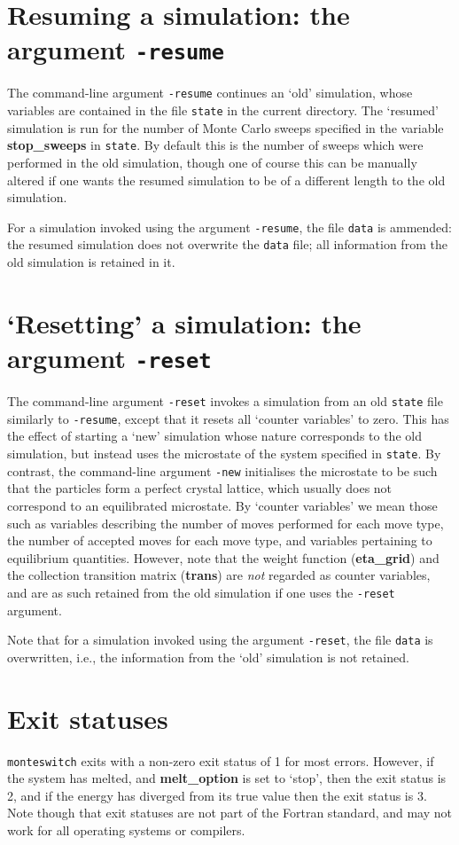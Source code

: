 \documentclass{report}
\begin{document}
\section{Resuming a simulation: the argument \texttt{-resume}}\label{sec:resume}
The command-line argument \texttt{-resume} continues an `old' simulation, whose variables are contained in the file \texttt{state} in the current 
directory. The `resumed' simulation is run for the number of Monte Carlo sweeps specified in the variable \textbf{stop\_sweeps} in \texttt{state}.
By default this is the number of sweeps which were performed in the old simulation, though one of course this can be manually altered if one wants
the resumed simulation to be of a different length to the old simulation.

For a simulation invoked using the argument \texttt{-resume}, the file \texttt{data} is ammended: the resumed simulation does not overwrite the
\texttt{data} file; all information from the old simulation is retained in it.

\section{`Resetting' a simulation: the argument \texttt{-reset}}\label{sec:reset}
The command-line argument \texttt{-reset} invokes a simulation from an old \texttt{state} file similarly to \texttt{-resume}, except that it
resets all `counter variables' to zero. This has the effect of starting a `new' simulation whose nature corresponds to the old simulation, 
but instead uses the microstate of the system specified in \texttt{state}. By contrast, the command-line argument \texttt{-new} initialises the 
microstate to be such that the particles form a perfect crystal lattice, which usually does not correspond to an equilibrated microstate.
By `counter variables' we mean those such as variables describing the number of moves performed for each move type, the number of accepted moves 
for each move type, and variables pertaining to equilibrium quantities. However, note that the weight function (\textbf{eta\_grid}) and the
collection transition matrix (\textbf{trans}) are \emph{not} regarded as counter variables, and are as such retained from the old simulation
if one uses the \texttt{-reset} argument.

Note that for a simulation invoked using the argument \texttt{-reset}, the file \texttt{data} is overwritten, i.e., the information from the `old'
simulation is not retained.

\section{Exit statuses}
\texttt{monteswitch} exits with a non-zero exit status of 1 for most errors. However, if the system has melted, and \textbf{melt\_option} is set to
`stop', then the exit status is 2, and if the energy has diverged from its true value then the exit status is 3. 
Note though that exit statuses are not part of the Fortran standard, and may not work for all operating systems or compilers. 
\end{document}
